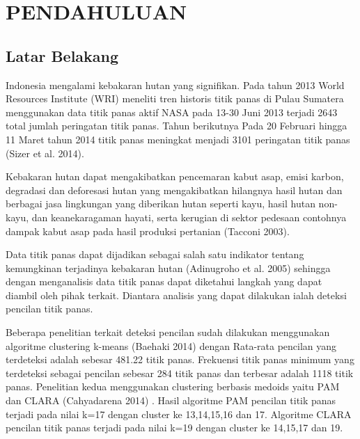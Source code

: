 \section*{PENDAHULUAN} %
\subsection*{Latar Belakang}
Indonesia mengalami kebakaran hutan yang signifikan. Pada tahun 2013 World Resources Institute (WRI)  meneliti tren historis titik panas di Pulau Sumatera menggunakan data titik panas aktif NASA pada 13-30 Juni 2013 terjadi 2643 total jumlah peringatan titik panas. Tahun berikutnya Pada  20 Februari hingga 11 Maret tahun 2014 titik panas meningkat menjadi 3101 peringatan titik panas (Sizer et al. 2014). 

Kebakaran hutan dapat mengakibatkan pencemaran kabut asap, emisi karbon, degradasi dan deforesasi hutan yang mengakibatkan hilangnya hasil hutan dan berbagai jasa lingkungan yang diberikan hutan seperti kayu, hasil hutan non- kayu, dan keanekaragaman hayati, serta kerugian di sektor pedesaan contohnya dampak kabut asap pada hasil produksi pertanian  (Tacconi 2003).

Data titik panas dapat dijadikan sebagai salah satu indikator tentang kemungkinan terjadinya kebakaran hutan (Adinugroho et al. 2005) sehingga dengan menganalisis data titik panas dapat diketahui langkah yang dapat diambil oleh pihak terkait. Diantara analisis yang dapat dilakukan ialah deteksi pencilan titik panas. 

Beberapa penelitian terkait deteksi pencilan sudah dilakukan menggunakan algoritme clustering k-means (Baehaki 2014) dengan Rata-rata pencilan yang terdeteksi adalah sebesar 481.22 titik panas. Frekuensi titik panas minimum yang terdeteksi sebagai pencilan sebesar 284 titik panas dan terbesar adalah 1118 titik panas. Penelitian kedua menggunakan clustering berbasis medoids yaitu PAM dan CLARA (Cahyadarena 2014)  . Hasil algoritme PAM pencilan titik panas terjadi pada nilai k=17 dengan cluster ke 13,14,15,16 dan 17. Algoritme CLARA pencilan titik panas terjadi pada nilai k=19 dengan cluster ke 14,15,17 dan 19.
 
